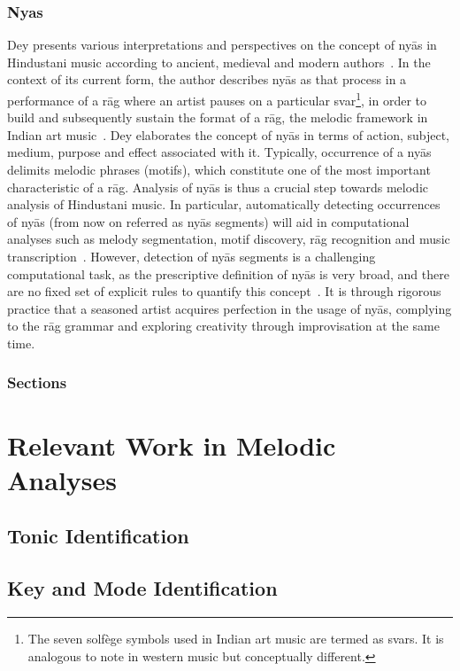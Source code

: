 \subsubsection{Nyas}
\label{sec:backgroung_nyas_description}

Dey presents various interpretations and perspectives on the concept of ny\={a}s in Hindustani music according to ancient, medieval and modern authors~\cite{Dey2008}. In the context of its current form, the author describes ny\={a}s as that process in a performance of a r\={a}g where an artist pauses on a particular svar\footnote{The seven solf\`{e}ge symbols used in Indian art music are termed as svars. It is analogous to note in western music but conceptually different.}, in order to build and subsequently sustain the format of a r\={a}g, the melodic framework in Indian art music~\cite[p. 70]{Dey2008}\cite{KKG_SS13}. Dey elaborates the concept of ny\={a}s in terms of action, subject, medium, purpose and effect associated with it. Typically, occurrence of a ny\={a}s delimits melodic phrases (motifs), which constitute one of the most important characteristic of a r\={a}g. Analysis of ny\={a}s is thus a crucial step towards melodic analysis of Hindustani music. In particular, automatically detecting occurrences of ny\={a}s (from now on referred as ny\={a}s segments) will aid in computational analyses such as melody segmentation, motif discovery, r\={a}g recognition and music transcription~\cite{GopalJNMR2012, Rao2014}. However, detection of ny\={a}s segments is a challenging computational task, as the prescriptive definition of ny\={a}s is very broad, and there are no fixed set of explicit rules to quantify this concept~\cite[p. 73]{Dey2008}. It is through rigorous practice that a seasoned artist acquires perfection in the usage of ny\={a}s, complying to the r\={a}g grammar and exploring creativity through improvisation at the same time. 


\subsubsection{Sections}

\section{Relevant Work in Melodic Analyses}
\subsection{Tonic Identification}
\subsection{Key and Mode Identification}

